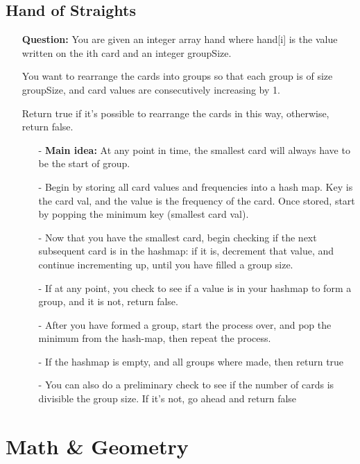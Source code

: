 \documentclass[12pt]{article}
\begin{document}
\subsection{Hand of Straights}
\begin{enumerate}
  \item[] \textbf{Question:} You are given an integer array hand where hand[i] is the value written on the ith card and an integer groupSize.

You want to rearrange the cards into groups so that each group is of size groupSize, and card values are consecutively increasing by 1.

Return true if it's possible to rearrange the cards in this way, otherwise, return false.

    \begin{enumerate}
      \item[-] \textbf{Main idea:} At any point in time, the smallest card will always have to be the start of group.
      \item[-] Begin by storing all card values and frequencies into a hash map. Key is the card val, and the value is the frequency of the card. Once stored, start by popping the minimum key (smallest card val). 
      \item[-] Now that you have the smallest card, begin checking if the next subsequent card is in the hashmap: if it is, decrement that value, and continue incrementing up, until you have filled a group size. 
      \item[-] If at any point, you check to see if a value is in your hashmap to form a group, and it is not, return false.
      \item[-] After you have formed a group, start the process over, and pop the minimum from the hash-map, then repeat the process.
      \item[-] If the hashmap is empty, and all groups where made, then return true
      \item[-] You can also do a preliminary check to see if the number of cards is divisible the group size. If it's not, go ahead and return false
    \end{enumerate}
\end{enumerate}

\section{Math {\&} Geometry}
\end{document}
